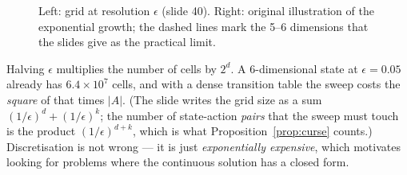 \documentclass[11pt,a4paper]{article}
\newcommand{\R}{\mathbb{R}}
\theoremstyle{plain}
\theoremstyle{definition}
\theoremstyle{remark}
\begin{document}
\begin{figure}[H]
\centering
\begin{minipage}{0.4\linewidth}
\centering
{}
\end{minipage}\hfill
\begin{minipage}{0.58\linewidth}
\centering
{}
\end{minipage}
\caption{Left: grid at resolution $\epsilon$ (slide 40). Right: original illustration of the exponential growth; the dashed lines mark the 5--6 dimensions that the slides give as the practical limit.}
\end{figure}

\begin{intuition}
Halving $\epsilon$ multiplies the number of cells by $2^d$. A 6-dimensional state at $\epsilon=0.05$ already has $6.4\times10^7$ cells, and with a dense transition table the sweep costs the \emph{square} of that times $|A|$. (The slide writes the grid size as a sum $(1/\epsilon)^d+(1/\epsilon)^k$; the number of state-action \emph{pairs} that the sweep must touch is the product $(1/\epsilon)^{d+k}$, which is what Proposition~\ref{prop:curse} counts.) Discretisation is not wrong --- it is just \emph{exponentially expensive}, which motivates looking for problems where the continuous solution has a closed form.
\end{intuition}

\end{document}
